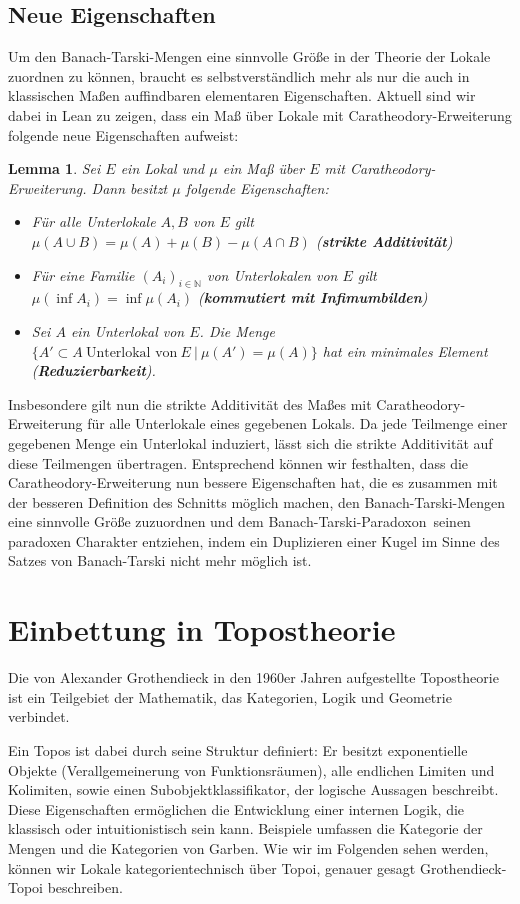 \documentclass{article}
\newtheorem{lemma}[satz]{Lemma}
\begin{document}
\subsection{Neue Eigenschaften}
Um den Banach-Tarski-Mengen eine sinnvolle Größe in der Theorie der Lokale zuordnen zu können, braucht es selbstverständlich mehr als nur die auch in klassischen Maßen auffindbaren elementaren Eigenschaften. Aktuell sind wir dabei in Lean zu zeigen, dass ein Maß über Lokale mit Caratheodory-Erweiterung folgende neue Eigenschaften aufweist: 
\begin{lemma}
Sei $E$ ein Lokal und $\mu$ ein Maß über $E$ mit Caratheodory-Erweiterung. Dann besitzt $\mu$ folgende Eigenschaften:
\begin{itemize}
    \item Für alle Unterlokale $A, B$ von $E$ gilt $\mu (A\cup B)=\mu (A)+\mu(B)-\mu(A\cap B)$ (\textbf{strikte Additivität})
    \item Für eine Familie $(A_i)_{i\in\mathbb{N}}$ von Unterlokalen von $E$ gilt $\mu (\inf A_i)=\inf\mu (A_i)$ (\textbf{kommutiert mit Infimumbilden}) 
    \item Sei $A$ ein Unterlokal von $E$. Die Menge $\{A'\subset A~\text{Unterlokal von}~E~|~\mu(A')=\mu(A)\}$ hat ein minimales Element (\textbf{Reduzierbarkeit}). 
\end{itemize}
\end{lemma}

\noindent Insbesondere gilt nun die strikte Additivität des Maßes mit Caratheodory-Erweiterung für alle Unterlokale eines gegebenen Lokals. Da jede Teilmenge einer gegebenen Menge ein Unterlokal induziert, lässt sich die strikte Additivität auf diese Teilmengen übertragen. Entsprechend können wir festhalten, dass die Caratheodory-Erweiterung nun bessere Eigenschaften hat, die es zusammen mit der besseren Definition des Schnitts möglich machen, den Banach-Tarski-Mengen eine sinnvolle Größe zuzuordnen und dem \glqq Banach-Tarski-Paradoxon\grqq~seinen paradoxen Charakter entziehen, indem ein Duplizieren einer Kugel im Sinne des Satzes von Banach-Tarski nicht mehr möglich ist.


\section{Einbettung in Topostheorie}
Die von Alexander Grothendieck in den 1960er Jahren aufgestellte Topostheorie ist ein Teilgebiet der Mathematik, das Kategorien, Logik und Geometrie verbindet. 

Ein Topos ist dabei durch seine Struktur definiert: Er besitzt exponentielle Objekte (Verallgemeinerung von Funktionsräumen), alle endlichen Limiten und Kolimiten, sowie einen Subobjektklassifikator, der logische Aussagen beschreibt. Diese Eigenschaften ermöglichen die Entwicklung einer internen Logik, die klassisch oder intuitionistisch sein kann. Beispiele umfassen die Kategorie der Mengen und die Kategorien von Garben. Wie wir im Folgenden sehen werden, können wir Lokale kategorientechnisch über Topoi, genauer gesagt Grothendieck-Topoi beschreiben. 
\end{document}
